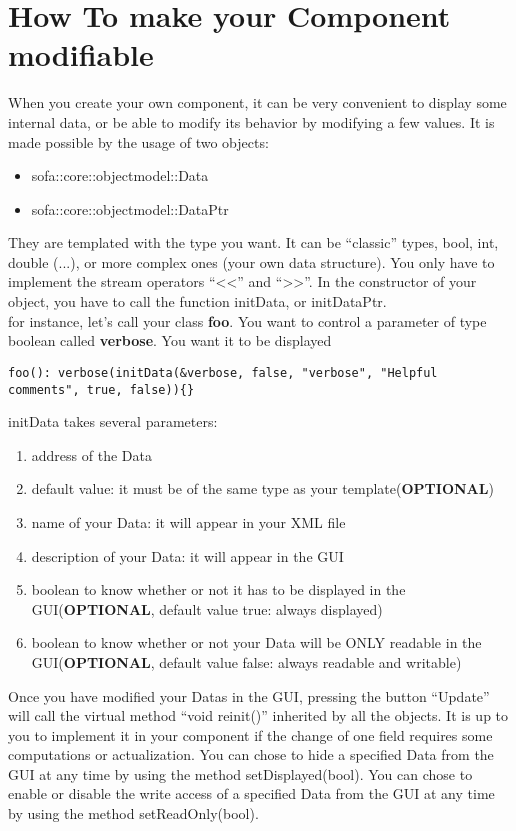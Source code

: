 
\section{How To make your Component modifiable}
When you create your own component, it can be very convenient to display some internal data, or be able to modify its behavior by modifying a few values. It is made possible by the usage of two objects:
\begin{itemize}
 \item sofa::core::objectmodel::Data
 \item sofa::core::objectmodel::DataPtr
\end{itemize}
They are templated with the type you want. It can be ``classic'' types, bool, int, double (...), or more complex ones (your own data structure). You only have to implement the stream operators ``<<'' and ``>>''. In the constructor of your object, you have to call the function initData, or initDataPtr. 
\\
for instance, let's call your class  {\bf foo}. You want to control a parameter of type boolean called {\bf verbose}. You want it to be displayed
\begin{verbatim}
foo(): verbose(initData(&verbose, false, "verbose", "Helpful comments", true, false)){}
\end{verbatim}

initData takes several parameters: 
\begin{enumerate}
 \item address of the Data
 \item default value: it must be of the same type as your template({\bf OPTIONAL})
 \item name of your Data: it will appear in your XML file
 \item description of your Data: it will appear in the GUI
 \item boolean to know whether or not it has to be displayed in the GUI({\bf OPTIONAL}, default value true: always displayed)
 \item boolean to know whether or not your Data will be ONLY readable in the GUI({\bf OPTIONAL}, default value false: always readable and writable)
\end{enumerate}

 Once you have modified your Datas in the GUI, pressing the button ``Update'' will call the virtual method ``void reinit()'' inherited by all the objects. It is up to you to implement it in your component if the change of one field requires some computations or actualization.
You can chose to hide a specified Data from the GUI at any time by using the method setDisplayed(bool).
You can chose to enable or disable the write access of a specified Data from the GUI at any time by using the method setReadOnly(bool).
